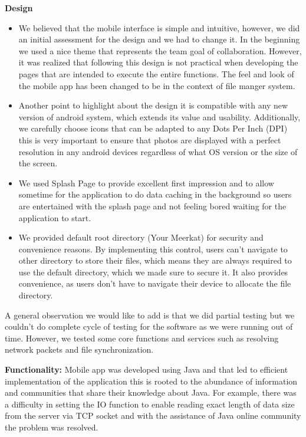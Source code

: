 \documentclass{article}
\begin{document}
\textbf{Design}
\begin{itemize}
\item We believed that the mobile interface is simple and intuitive, however, we did an initial assessment for the design and we had to change it. In the beginning we used a nice theme that represents the team goal of collaboration. However, it was realized that following this design is not practical when developing the pages that are intended to execute the entire functions. The feel and look of the mobile app has been changed to be in the context of file manger system.
\item Another point to highlight about the design it is compatible with any new version of android system, which extends its value and usability. Additionally, we carefully choose icons that can be adapted to any Dots Per Inch (DPI) this is very important to ensure that photos are displayed with a perfect resolution in any android devices regardless of what OS version or the size of the screen.
\item We used Splash Page to provide excellent first impression and to allow sometime for the application to do data caching in the background so users are entertained with the splash page and not feeling bored waiting for the application to start.
\item We provided default root directory (Your Meerkat) for security and convenience reasons. By implementing this control, users can’t navigate to other directory to store their files, which means they are always required to use the default directory, which we made sure to secure it. It also provides convenience, as users don’t have to navigate their device to allocate the file directory.
\end{itemize}

A general observation we would like to add is that we did partial testing but we couldn’t do complete cycle of testing for the software as we were running out of time. However, we tested some core functions and services such as resolving network packets and file synchronization.

\textbf{Functionality:}
Mobile app was developed using Java and that led to efficient implementation of the application this is rooted to the abundance of information and communities that share their knowledge about Java. For example, there was a difficulty in setting the IO function to enable reading exact length of data size from the server via TCP socket and with the assistance of Java online community the problem was resolved.
\end{document}
